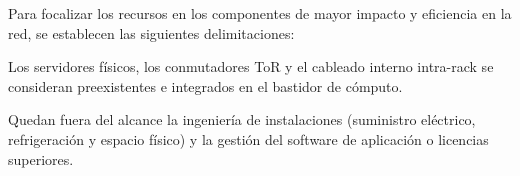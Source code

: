 Para focalizar los recursos en los componentes de mayor impacto y eficiencia en la red, se establecen las siguientes delimitaciones:

\begin{tight-list}
    \setlength{\itemsep}{0pt}
    \setlength{\topsep}{2pt}
    \setlength{\parsep}{0pt}
    \item Los servidores físicos, los conmutadores ToR y el cableado interno intra-rack se consideran preexistentes e integrados en el bastidor de cómputo.
    \item Quedan fuera del alcance la ingeniería de instalaciones (suministro eléctrico, refrigeración y espacio físico) y la gestión del software de aplicación o licencias superiores.
\end{tight-list}
